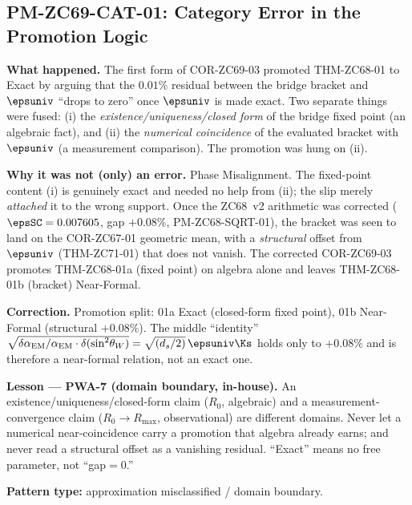 \documentclass[12pt, a4paper]{article}
\renewcommand{\swsq}{\sin^2\!\theta_W}
\renewcommand{\aEM}{\alpha_{\rm EM}}
\begin{document}

\subsection{PM-ZC69-CAT-01: Category Error in the Promotion Logic}


\begin{derivedbox}[title={PM-ZC69-CAT-01: Measurement-Convergence Used
  to Justify an Existence Promotion --- Scar (Failure Stance)}]

\textbf{What happened.}
The first form of COR-ZC69-03 promoted THM-ZC68-01 to Exact by arguing
that the $0.01\%$ residual between the bridge bracket and $\epsuniv$
``drops to zero'' once $\epsuniv$ is made exact. Two separate things were
fused: (i) the \emph{existence/uniqueness/closed form} of the bridge
fixed point (an algebraic fact), and (ii) the \emph{numerical
coincidence} of the evaluated bracket with $\epsuniv$ (a measurement
comparison). The promotion was hung on (ii).

\textbf{Why it was not (only) an error.}
Phase Misalignment. The fixed-point content (i) is genuinely exact and
needed no help from (ii); the slip merely \emph{attached} it to the
wrong support. Once the ZC68~v2 arithmetic was corrected
($\epsSC = 0.007605$, gap $+0.08\%$, PM-ZC68-SQRT-01), the bracket was
seen to land on the COR-ZC67-01 geometric mean, with a \emph{structural}
offset from $\epsuniv$ (THM-ZC71-01) that does not vanish. The
corrected COR-ZC69-03 promotes THM-ZC68-01a (fixed point) on algebra
alone and leaves THM-ZC68-01b (bracket) Near-Formal.

\textbf{Correction.}
Promotion split: 01a Exact (closed-form fixed point), 01b Near-Formal
(structural $+0.08\%$). The middle ``identity''
$\sqrt{\delta\aEM/\aEM\cdot\delta(\swsq)} = \sqrt{(d_s/2)}\,\epsuniv\Ks$
holds only to $+0.08\%$ and is therefore a near-formal relation, not an
exact one.

\textbf{Lesson --- PWA-7 (domain boundary, in-house).}
An existence/uniqueness/closed-form claim ($R_0$, algebraic) and a
measurement-convergence claim ($R_0\!\to\!R_{\max}$, observational) are
different domains. Never let a numerical near-coincidence carry a
promotion that algebra already earns; and never read a structural offset
as a vanishing residual. ``Exact'' means no free parameter, not
``gap${=}0$.''

\textbf{Pattern type:} approximation misclassified / domain boundary.
\end{derivedbox}
\end{document}
